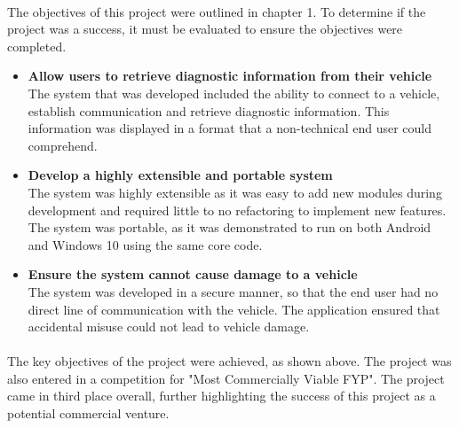 	\paragraph{}{
	The objectives of this project were outlined in chapter 1. To determine if the project was a success, it must be evaluated to ensure the objectives were completed. 
		\begin{itemize}
			\item \textbf{Allow users to retrieve diagnostic information from their vehicle}\\
			The system that was developed included the ability to connect to a vehicle, establish communication and retrieve diagnostic information. This information was displayed in a format that a non-technical end user could comprehend.
			
			\item \textbf{Develop a highly extensible and portable system}\\
			The system was highly extensible as it was easy to add new modules during development and required little to no refactoring to implement new features. The system was portable, as it was demonstrated to run on both Android and Windows 10 using the same core code. 

			\item \textbf{Ensure the system cannot cause damage to a vehicle}\\
			The system was developed in a secure manner, so that the end user had no direct line of communication with the vehicle. The application ensured that accidental misuse could not lead to vehicle damage. 
		\end{itemize}
	}
	\paragraph{}{
	The key objectives of the project were achieved, as shown above. The project was also entered in a competition for "Most Commercially Viable FYP". The project came in third place overall, further highlighting the success of this project as a potential commercial venture.
	}
	
